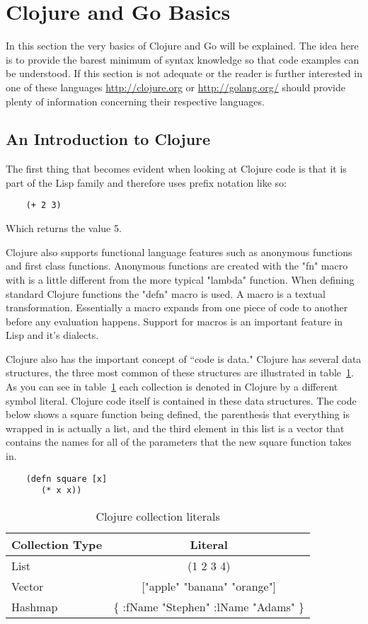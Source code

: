 \documentclass{acm_proc_article-sp}
\begin{document}
\section{Clojure and Go Basics}
	In this section the very basics of Clojure and Go will be explained. The idea here is to provide the barest minimum of syntax knowledge so that code examples can be understood. If this section is not adequate or the reader is further interested in one of these languages \url{http://clojure.org} or \url{http://golang.org/} should provide plenty of information concerning their respective languages.
	
\subsection{An Introduction to Clojure}
	The first thing that becomes evident when looking at Clojure code is that it is part of the Lisp family and therefore uses prefix notation like so:
	\begin{verbatim}
	(+ 2 3)
	\end{verbatim}
	Which returns the value 5. 
	
Clojure also supports functional language features such as anonymous functions and first class functions. Anonymous functions are created with the "fn" macro with is a little different from the more typical "lambda" function. When defining standard Clojure functions the "defn" macro is used. A macro is a textual transformation. Essentially a macro expands from one piece of code to another before any evaluation happens. Support for macros is an important feature in Lisp and it's dialects.

	Clojure also has the important concept of ``code is data." Clojure has several data structures, the three most common of these structures are illustrated in table~\ref{coll:table}. As you can see in table~\ref{coll:table} each collection is denoted in Clojure by a different symbol literal. Clojure code itself is contained in these data structures. The code below shows a square function being defined, the parenthesis that everything is wrapped in is actually a list, and the third element in this list is a vector that contains the names for all of the parameters that the new square function takes in.
	
	\begin{verbatim}
	(defn square [x]
	   (* x x))
	\end{verbatim}
	
	\begin{table}[t]
	\caption{Clojure collection literals\label{coll:table}}	
	\begin{tabular}{ | l | c | }
	\hline
	Collection Type & Literal \\ \hline
	List & (1 2 3 4) \\ \hline
	Vector & ["apple" "banana" "orange"] \\ \hline
	Hashmap & \{ :fName "Stephen" :lName "Adams" \}\\
	\hline
	\end{tabular}
	\end{table}
	
\end{document}
